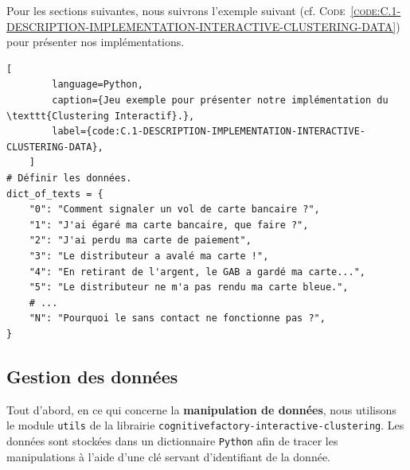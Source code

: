 	Pour les sections suivantes, nous suivrons l'exemple suivant (cf. \textsc{Code~\ref{code:C.1-DESCRIPTION-IMPLEMENTATION-INTERACTIVE-CLUSTERING-DATA}}) pour présenter nos implémentations.
	
	\begin{lstlisting}[
		language=Python,
		caption={Jeu exemple pour présenter notre implémentation du \texttt{Clustering Interactif}.},
		label={code:C.1-DESCRIPTION-IMPLEMENTATION-INTERACTIVE-CLUSTERING-DATA},
	]
# Définir les données.
dict_of_texts = {
	"0": "Comment signaler un vol de carte bancaire ?",
	"1": "J'ai égaré ma carte bancaire, que faire ?",
	"2": "J'ai perdu ma carte de paiement",
	"3": "Le distributeur a avalé ma carte !",
	"4": "En retirant de l'argent, le GAB a gardé ma carte...",
	"5": "Le distributeur ne m'a pas rendu ma carte bleue.",
	# ...
	"N": "Pourquoi le sans contact ne fonctionne pas ?",
}
	\end{lstlisting}
	
	
	\subsection{Gestion des données}
	\label{annex:C.1.1-DESCRIPTION-IMPLEMENTATION-INTERACTIVE-CLUSTERING-GESTION-DES-DONNEES}
	
	Tout d'abord, en ce qui concerne la \textbf{manipulation de données}, nous utilisons le module \texttt{utils} de la librairie \texttt{cognitivefactory-interactive-clustering}.
	Les données sont stockées dans un dictionnaire \texttt{Python} afin de tracer les manipulations à l'aide d'une clé servant d'identifiant de la donnée.
	

